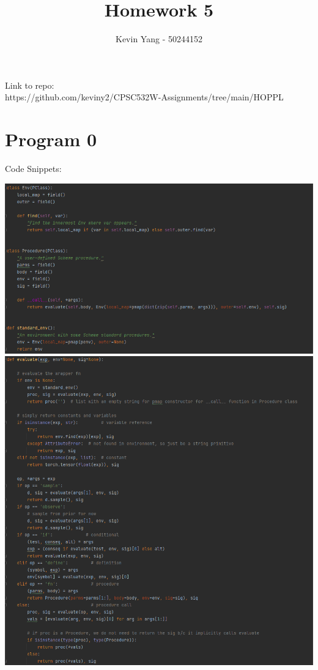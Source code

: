 \documentclass[10pt]{homeworg}
\title{Homework 5}
\author{Kevin Yang - 50244152}
\begin{document}
\maketitle

\Huge{Link to repo:}\\
\Large{https://github.com/keviny2/CPSC532W-Assignments/tree/main/HOPPL}

\section*{Program 0}
Code Snippets:
\begin{center}
\includegraphics[scale=0.5]{../figures/environment.png}
\includegraphics[scale=0.5]{../figures/evaluate.png}

\end{center}
\end{document}

